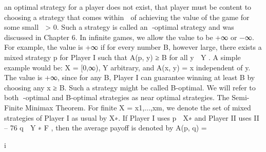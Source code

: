 an optimal strategy for a player does not exist, that player must be content to choosing
a strategy that comes within  of achieving the value of the game for some small  > 0.
Such a strategy is called an -optimal strategy and was discussed in Chapter 6.
In infinite games, we allow the value to be +∞ or −∞. For example, the value is +∞
if for every number B, however large, there exists a mixed strategy p for Player I such
that A(p, y) ≥ B for all y ∈ Y . A simple example would be: X = [0,∞), Y arbitrary, and
A(x, y) = x independent of y. The value is +∞, since for any B, Player I can guarantee
winning at least B by choosing any x ≥ B. Such a strategy might be called B-optimal.
We will refer to both -optimal and B-optimal strategies as near optimal strategies.
The Semi-Finite Minimax Theorem. For finite X = {x1,...,xm}, we denote the set
of mixed strategies of Player I as usual by X∗. If Player I uses p ∈ X∗ and Player II uses
II – 76
q ∈ Y ∗
F , then the average payoff is denoted by
A(p, q) = 

i


